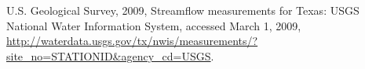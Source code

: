 \documentclass[12pt]{article}
\begin{document}
\begin{thebibliography}{3}



U.S. Geological Survey, 2009, Streamflow measurements for Texas: USGS National Water Information System, accessed March 1, 2009, \url{http://waterdata.usgs.gov/tx/nwis/measurements/?site_no=STATIONID&agency_cd=USGS}.


\end{thebibliography}
\end{document}
